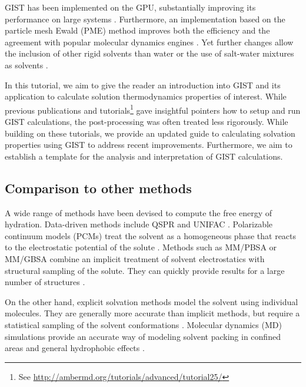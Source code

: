 \documentclass[9pt,tutorial]{livecoms}
\begin{document}
GIST has been implemented on the GPU, substantially improving its performance on large systems \cite{Kraml2019-gigist}.
Furthermore, an implementation based on the particle mesh Ewald (PME) \cite{Darden1993-pme} method improves both the efficiency and the agreement with popular molecular dynamics engines \cite{Chen2021}. 
Yet further changes allow the inclusion of other rigid solvents than water \cite{Kraml2020,Waibl2022-gist-solvents} or the use of salt-water mixtures as solvents \cite{Waibl2021-gist-salt}.

In this tutorial, we aim to give the reader an introduction into GIST and its application to calculate solution thermodynamics properties of interest. 
While previous publications \cite{Ramsey2016} and tutorials\footnote{See \url{http://ambermd.org/tutorials/advanced/tutorial25/}} gave insightful pointers how to setup and run GIST calculations, the post-processing was often treated less rigorously. While building on these tutorials, we provide an updated guide to calculating solvation properties using GIST to address recent improvements.
Furthermore, we aim to establish a template for the analysis and interpretation of GIST calculations.

\subsection{Comparison to other methods}
A wide range of methods have been devised to compute the free energy of hydration.
Data-driven methods include QSPR and UNIFAC \cite{Borhani2019-qspr,Fredenslund1975-unifac}.
Polarizable continuum models (PCMs) \cite{Miertus1981-pcm,Klamt1993-cosmo} treat the solvent as a homogeneous phase that reacts to the electrostatic potential of the solute \cite{Mennucci2010-pcm}.
Methods such as MM/PBSA or MM/GBSA \cite{Sitkoff1994-pbsa,Kollman2000-mmpbsa} combine an implicit treatment of solvent electrostatics with structural sampling of the solute.
They can quickly provide results for a large number of structures \cite{Genheden2015-mmpbsa-review}.

On the other hand, explicit solvation methods model the solvent using individual molecules.
They are generally more accurate than implicit methods, but require a statistical sampling of the solvent conformations \cite{Liu2016-md-solubility,Swails2014-cphmd}.
Molecular dynamics (MD) simulations provide an accurate way of modeling solvent packing in confined areas \cite{Haider2016-water-on-surfaces} and general hydrophobic effects \cite{Pratt2016-hydrophobicity}.
\end{document}
